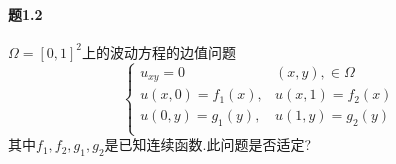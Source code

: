 \documentclass[12pt]{article}
\begin{document}
    \paragraph{题1.2}$\Omega=[0,1]^2$上的波动方程的边值问题
    $$\begin{cases}
        u_{xy}=0&(x,y),\in \Omega\\
        u(x,0)=f_1(x),& u(x,1)=f_2(x)\\
        u(0,y)=g_1(y),& u(1,y)=g_2(y)\\
    \end{cases}$$
    其中$f_1,f_2,g_1,g_2$是已知连续函数.此问题是否适定?
\end{document}
